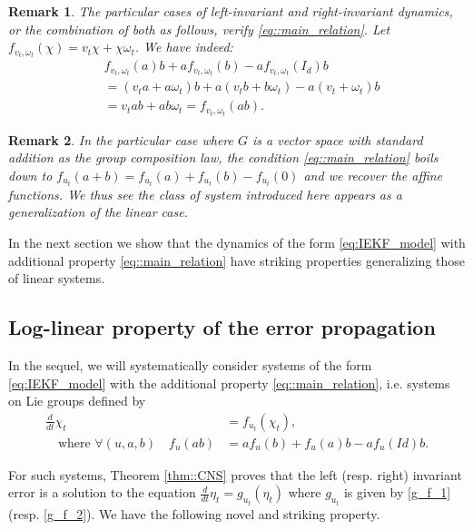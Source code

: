 \documentclass[a4paper,12pt,onecolumn]{article}
\newtheorem{rem}{Remark}
\begin{document}
\begin{rem}
The particular cases of left-invariant and right-invariant dynamics, or the combination of both as follows, verify \eqref{eq::main_relation}. Let $f_{v_t,\omega_t} (\chi) = v_t \chi +  \chi \omega_t$. We have indeed:
\begin{align*}
&f_{v_t,\omega_t}(a)b+af_{v_t,\omega_t}(b)- a f_{v_t,\omega_t}(I_d)b \\&=  (v_t a + a \omega_t) b + a(v_t b + b \omega_t) - a (v_t + \omega_t) b \\
 &  =  v_t a b + ab \omega_t = f_{v_t,\omega_t}(ab).
\end{align*}
\end{rem}

\begin{rem}
In the particular case where $G$ is a vector space with  standard addition as the group composition law,  the condition \eqref{eq::main_relation} boils down to $f_{u_t}(a+b) = f_{u_t}(a) + f_{u_t}(b) -f_{u_t}(0)$ and we recover the affine functions. We thus see the class of system introduced here  appears as a generalization of the linear case. 
\end{rem}




In the next section we show that the dynamics of the form \eqref{eq:IEKF_model} with additional property  \eqref{eq::main_relation} have striking properties  generalizing those of linear systems. 





\subsection{Log-linear property of the error propagation}
In the sequel, we will systematically consider systems of the form \eqref{eq:IEKF_model} with the additional property  \eqref{eq::main_relation}, i.e.  systems on Lie groups defined by
\begin{equation}
\label{eq::mult_linear}
\begin{aligned}\frac{d}{dt} \chi_t & = f_{u_t}(\chi_t), \\
\quad\text{where $\forall (u,a,b)$}\quad
f_u(ab) & =af_u(b)+f_u(a)b-af_u(Id)b.
\end{aligned}
\end{equation}





For such systems, Theorem \ref{thm::CNS} proves that the left (resp. right) invariant error  is a solution to the equation  $\frac{d}{dt}\eta_t=g_{u_t}(\eta_t)$ where $g_{u_t}$ is given by   \eqref{g_f_1} (resp. \eqref{g_f_2}).  We have the following novel and striking property. 
\end{document}

